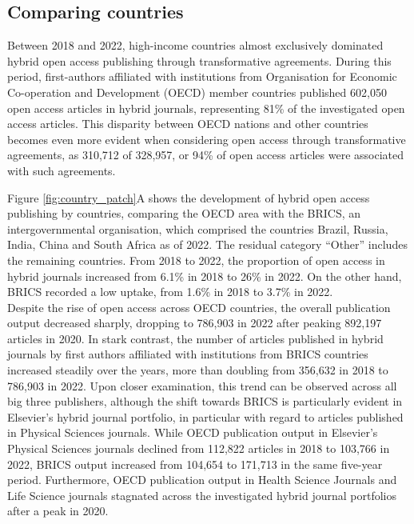 \documentclass[a4paper,man,floatsintext,longtable,noextraspace,12pt]{apa6}
\begin{document}
\hypertarget{comparing-countries}{%
\subsection{Comparing countries}\label{comparing-countries}}

Between 2018 and 2022, high-income countries almost exclusively
dominated hybrid open access publishing through transformative
agreements. During this period, first-authors affiliated with
institutions from Organisation for Economic Co-operation and Development
(OECD) member countries published 602,050 open access articles in hybrid
journals, representing 81\% of the investigated open access articles.
This disparity between OECD nations and other countries becomes even
more evident when considering open access through transformative
agreements, as 310,712 of 328,957, or 94\% of open access articles were
associated with such agreements.

Figure \ref{fig:country_patch}A shows the development of hybrid open
access publishing by countries, comparing the OECD area with the BRICS,
an intergovernmental organisation, which comprised the countries Brazil,
Russia, India, China and South Africa as of 2022. The residual category
``Other'' includes the remaining countries. From 2018 to 2022, the
proportion of open access in hybrid journals increased from 6.1\% in
2018 to 26\% in 2022. On the other hand, BRICS recorded a low uptake,
from 1.6\% in 2018 to 3.7\% in 2022.\\
Despite the rise of open access across OECD countries, the overall
publication output decreased sharply, dropping to 786,903 in 2022 after
peaking 892,197 articles in 2020. In stark contrast, the number of
articles published in hybrid journals by first authors affiliated with
institutions from BRICS countries increased steadily over the years,
more than doubling from 356,632 in 2018 to 786,903 in 2022. Upon closer
examination, this trend can be observed across all big three publishers,
although the shift towards BRICS is particularly evident in Elsevier's
hybrid journal portfolio, in particular with regard to articles
published in Physical Sciences journals. While OECD publication output
in Elsevier's Physical Sciences journals declined from 112,822 articles
in 2018 to 103,766 in 2022, BRICS output increased from 104,654 to
171,713 in the same five-year period. Furthermore, OECD publication
output in Health Science Journals and Life Science journals stagnated
across the investigated hybrid journal portfolios after a peak in 2020.
\end{document}
